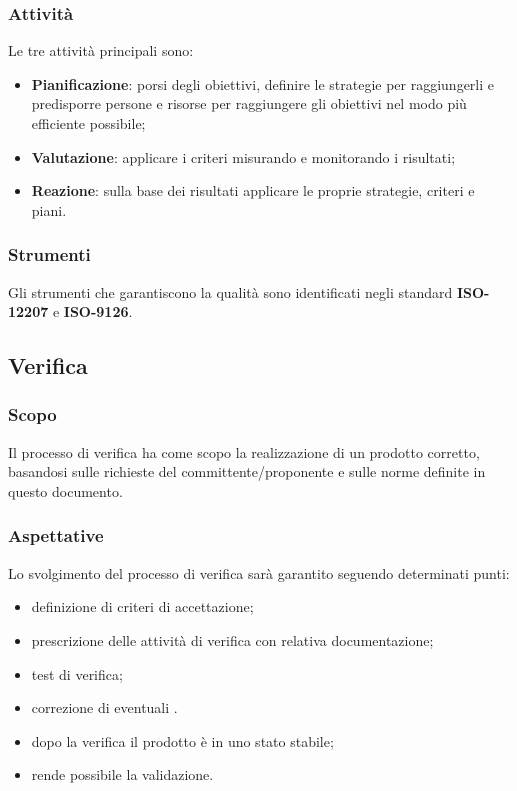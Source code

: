 		\subsubsection{Attività}
		Le tre attività principali sono:
		\begin{itemize}
		\item \textbf{Pianificazione}: porsi degli obiettivi, definire le strategie per raggiungerli e predisporre persone e risorse per raggiungere gli obiettivi nel modo più efficiente possibile;
		\item \textbf{Valutazione}: applicare i criteri misurando e monitorando i risultati;
		\item \textbf{Reazione}: sulla base dei risultati applicare le proprie strategie, criteri e piani.
		\end{itemize}
		\subsubsection{Strumenti}
		Gli strumenti che garantiscono la qualità sono identificati negli standard \textbf{ISO-12207} e \textbf{ISO-9126}.
	\subsection{Verifica}
		\subsubsection{Scopo}
			Il processo di verifica ha come scopo la realizzazione di un prodotto corretto, basandosi sulle richieste del committente/proponente e sulle norme definite in questo documento.
		\subsubsection{Aspettative}
		Lo svolgimento del processo di verifica sarà garantito seguendo determinati punti:
    \begin{itemize}
        \item definizione di criteri di accettazione;
	\item prescrizione delle attività di verifica con relativa documentazione;
	\item test di verifica;
	\item correzione di eventuali .
	\item dopo la verifica il prodotto è in uno stato stabile;
	\item rende possibile la validazione.
    \end{itemize}
